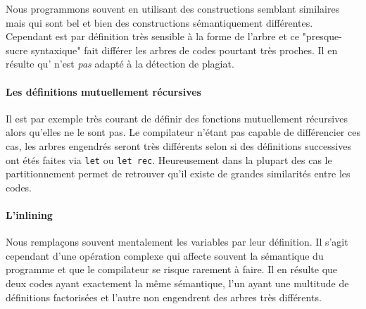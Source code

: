 
Nous programmons souvent en utilisant des constructions semblant
similaires mais qui sont bel et bien des constructions sémantiquement
différentes. Cependant {\Asak} est par définition très sensible à la
forme de l'arbre {\LambdaCode} et ce "presque-sucre syntaxique" fait
différer les arbres de codes pourtant très proches. Il en résulte
qu'{\Asak} n'est \emph{pas} adapté à la détection de plagiat.

\paragraph{Les définitions mutuellement récursives}

Il est par exemple très courant de définir des fonctions mutuellement
récursives alors qu'elles ne le sont pas. Le compilateur n'étant pas
capable de différencier ces cas, les arbres engendrés seront très
différents selon si des définitions successives ont étés faites via
\verb|let| ou \verb|let rec|. Heureusement dans la plupart des cas le partitionnement permet de retrouver qu'il existe de grandes similarités entre les codes.

\paragraph{L'inlining}

Nous remplaçons souvent mentalement les variables par leur
définition. Il s'agit cependant d'une opération complexe qui affecte
souvent la sémantique du programme et que le compilateur se risque
rarement à faire. Il en résulte que deux codes ayant exactement la
même sémantique, l'un ayant une multitude de définitions factorisées
et l'autre non engendrent des arbres très différents.
